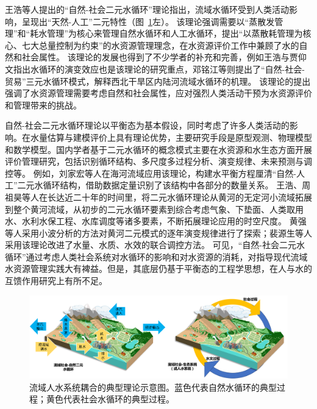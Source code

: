 王浩等人提出的“自然-社会二元水循环”理论指出，流域水循环受到人类活动影响，呈现出“天然-人工”二元特性\cite{wang2006}（图~\ref{ch1:fig:two_water_cycle}左）。
该理论强调需要以“蒸散发管理”和“耗水管理”为核心来管理自然水循环和人工水循环，提出“以蒸散耗管理为核心、七大总量控制为约束”的水资源管理理念，在水资源评价工作中兼顾了水的自然和社会属性\cite{wang2010}。
该理论的发展也得到了不少学者的补充和完善，例如王浩与贾仰文指出水循环的演变效应也是该理论的研究重点\cite{wang2016}，邓铭江等则提出了“自然-社会-贸易”三元水循环模式，解释西北干旱区内陆河流域水循环的机理\cite{deng2020}。
该理论的提出强调了水资源管理需要考虑自然和社会属性，应对强烈人类活动干预为水资源评价和管理带来的挑战。

自然-社会二元水循环理论以平衡态为基本假设，同时考虑了许多人类活动的影响。在水量估算与建模评价上具有理论优势，主要研究手段是原型观测、物理模型和数学模型。国内学者基于二元水循环的概念模式主要在水资源和水生态方面开展评价管理研究，包括识别循环结构、多尺度多过程分析、演变规律、未来预测与调控等\cite{wang2016}。
例如，刘家宏等人在海河流域应用该理论，构建水平衡方程厘清“自然-人工”二元水循环结构，借助数据定量识别了该结构中各部分的数量关系\cite{liu2010}。
王浩\cite{wang2004}、周祖昊\cite{zhou2022a}等人在长达近二十年的时间里，将二元水循环理论从黄河的无定河小流域拓展到整个黄河流域，从初步的二元水循环要素到综合考虑气象、下垫面、人类取用水、水利水保工程、水库调度等诸多要素，不断拓展理论应用的时空尺度。
黄强等人采用小波分析的方法对黄河二元模式的逐年演变规律进行了探索\cite{huang2002}；裴源生等人采用该理论改进了水量、水质、水效的联合调控方法\cite{pei2020}。
可见，“自然-社会二元水循环”通过考虑人类社会系统对水循环的影响和对水资源的消耗，对指导现代流域水资源管理实践大有裨益。但是，其底层仍基于平衡态的工程学思想，在人与水的互馈作用研究上有所不足。

\begin{figure}[!h]
    \centering
    \includegraphics[width=\textwidth]{img/ch1/ch1_two_water_cycle.png}
    \caption[流域人水耦合系统的典型理论示意图]{流域人水系统耦合的典型理论示意图\cite{wang2006,dibaldassarre2015}。蓝色代表自然水循环的典型过程；黄色代表社会水循环的典型过程。}\label{ch1:fig:two_water_cycle}
\end{figure}

